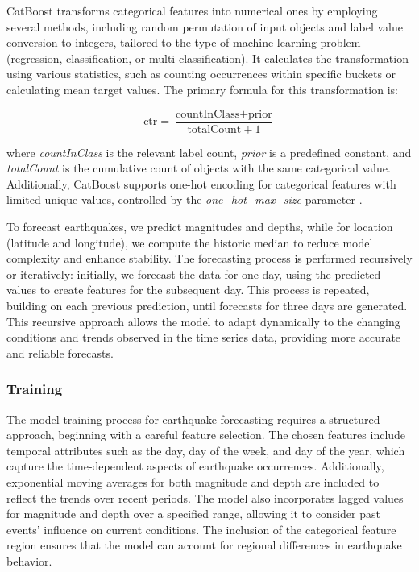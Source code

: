 CatBoost transforms categorical features into numerical ones by employing
several methods, including random permutation of input objects and label
value conversion to integers, tailored to the type of machine learning problem
(regression, classification, or multi-classification). It calculates the
transformation using various statistics, such as counting occurrences within
specific buckets or calculating mean target values. The primary formula for
this transformation is:

\[\text{ctr} = \frac{\text{countInClass} + \text{prior}}{\text{totalCount} + 1}\]

where \textit{countInClass} is the relevant label count, \textit{prior} is a
predefined constant, and \textit{totalCount} is the cumulative count of objects
with the same categorical value. Additionally, CatBoost supports one-hot encoding
for categorical features with limited unique values, controlled by the
\textit{one\_hot\_max\_size} parameter \parencite{catboost-encoding}.

To forecast earthquakes, we predict magnitudes and depths, while for location
(latitude and longitude), we compute the historic median to reduce model
complexity and enhance stability. The forecasting process is performed
recursively or iteratively: initially, we forecast the data for one day,
using the predicted values to create features for the subsequent day.
This process is repeated, building on each previous prediction, until
forecasts for three days are generated. This recursive approach allows
the model to adapt dynamically to the changing conditions and trends
observed in the time series data, providing more accurate and reliable forecasts.

\subsubsection{Training}
The model training process for earthquake forecasting requires a structured
approach, beginning with a careful feature selection. The chosen features
include temporal attributes such as the day, day of the week, and day of
the year, which capture the time-dependent aspects of earthquake occurrences.
Additionally, exponential moving averages for both magnitude and depth are
included to reflect the trends over recent periods. The model also incorporates
lagged values for magnitude and depth over a specified range, allowing it to
consider past events' influence on current conditions. The inclusion of the
categorical feature region ensures that the model can account for regional
differences in earthquake behavior.

